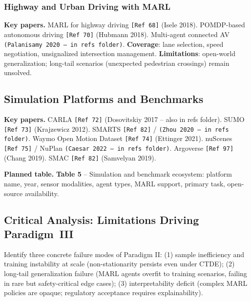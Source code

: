 \documentclass[12pt, a4paper]{article}
\begin{document}
\subsubsection{Highway and Urban Driving with MARL}

\begin{outline_note}
\textbf{Key papers.}
MARL for highway driving \texttt{[Ref\,68]} (Isele 2018).
POMDP-based autonomous driving \texttt{[Ref\,70]} (Hubmann 2018).
Multi-agent connected AV \texttt{(Palanisamy 2020 -- in refs folder)}.
\textbf{Coverage}: lane selection, speed negotiation, unsignalized
intersection management.
\textbf{Limitations}: open-world generalization; long-tail scenarios
(unexpected pedestrian crossings) remain unsolved.
\end{outline_note}

\subsection{Simulation Platforms and Benchmarks}
\label{sec:sim}

\begin{outline_note}
\textbf{Key papers.}
CARLA \texttt{[Ref\,72]} (Dosovitskiy 2017 -- also in refs folder).
SUMO \texttt{[Ref\,73]} (Krajzewicz 2012).
SMARTS \texttt{[Ref\,82]} / \texttt{(Zhou 2020 -- in refs folder)}.
Waymo Open Motion Dataset \texttt{[Ref\,74]} (Ettinger 2021).
nuScenes \texttt{[Ref\,75]} / NuPlan \texttt{(Caesar 2022 -- in refs folder)}.
Argoverse \texttt{[Ref\,97]} (Chang 2019).
SMAC \texttt{[Ref\,82]} (Samvelyan 2019).

\textbf{Planned table.}
\textbf{Table 5} -- Simulation and benchmark ecosystem:
platform name, year, sensor modalities, agent types, MARL support,
primary task, open-source availability.
\end{outline_note}

\subsection{Critical Analysis: Limitations Driving Paradigm~III}

\begin{outline_note}
Identify three concrete failure modes of Paradigm II:
(1) sample inefficiency and training instability at scale (non-stationarity
persists even under CTDE);
(2) long-tail generalization failure (MARL agents overfit to training
scenarios, failing in rare but safety-critical edge cases);
(3) interpretability deficit (complex MARL policies are opaque;
regulatory acceptance requires explainability).
\end{outline_note}
\end{document}
